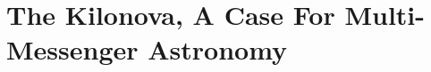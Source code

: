 \begin{comment}

Li \& Paczynski (1998, LP98) first showed that the radioactive ejecta from a NS-NS or BH-NS merger provides a source for powering transient emission, in analogy with Type Ia SNe. 
Given the low mass and high velocity of the ejecta from a NS-NS/BH-NS merger, they concluded that the ejecta will become transparent to its own radiation quickly, producing emission which peaks on a timescale of about one day, much faster than for normal SNe (which instead peak on a timescale of weeks or longer).

Freiburghaus et al. (1999) presented the first explicit calculations showing that the ejecta properties extracted from a hydrodynamical simulation of a NS-NS merger (Rosswog et al. 1999) indeed produces abundance patterns in basic accord with the solar system r-process.

In the late 50's Burbidge et al. (1957) and Cameron (1957) had already proposed that approximately half of the elements heavier than iron are synthesized via the capture of neutrons onto lighter seed nuclei (e.g., iron) in a dense neutron-rich environment in which the timescale for neutron capture is shorter than the $\beta$-decay timescale.
Rapid neutron capture process', or r-process for short, 
Despite this mechanism was known for long time, the astrophysical environments in which this happens remained a mystery.
They showed that the radioactive heating rate was relatively insensitive to the precise electron fraction of the ejecta, and they were the first to consider how efficiently the decay products thermalize their energy in the ejecta.

The type of radiation depends on the EOS for the ejecta and its thermodynamical properties. Opacity, nucleon and particle content, pressure, temperature, MHD state.

Li \& Paczynski (1998, LP98) first showed that the radioactive ejecta from a NS-NS or BH-NS merger provides a source for powering transient emission, in analogy with Type Ia SNe. Given the low mass and high velocity of the ejecta from a NS-NS/BH-NS merger, they concluded that the ejecta will become transparent to its own radiation quickly, producing emission which peaks on a timescale of about one day, much faster than for normal SNe (which instead peak on a timescale of weeks or longer).

\end{comment}


\chapter{The Kilonova, A Case For Multi-Messenger Astronomy} \label{kilonovachapter}

